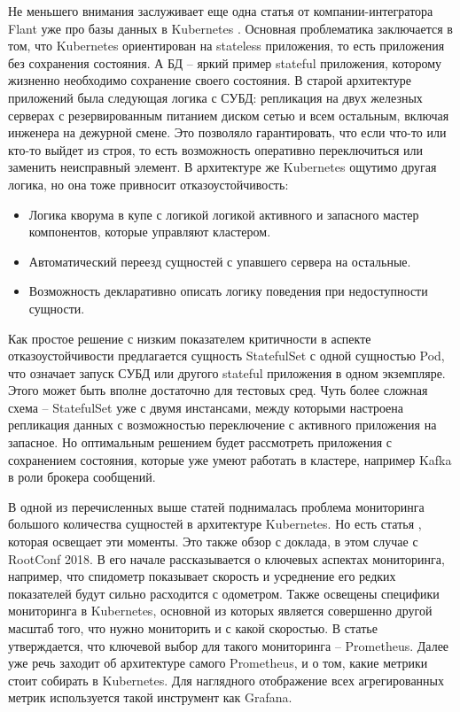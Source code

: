 Не меньшего внимания заслуживает еще одна статья от компании-интегратора Flant уже про базы данных в Kubernetes \cite{habr:flant:db-and-k8s}. Основная проблематика заключается в том, что Kubernetes ориентирован на stateless приложения, то есть приложения без сохранения состояния. А БД
-- яркий пример stateful приложения,
которому жизненно необходимо сохранение своего состояния. В старой архитектуре приложений была следующая логика с СУБД: репликация на двух железных серверах с резервированным питанием диском сетью и всем остальным, включая инженера на дежурной смене. Это позволяло гарантировать, что если что-то или кто-то выйдет из строя, то есть возможность оперативно переключиться или заменить неисправный элемент. В архитектуре же Kubernetes ощутимо другая логика, но она тоже привносит отказоустойчивость:
\begin{itemize}
    \item Логика кворума в купе с логикой логикой активного и запасного мастер компонентов, которые управляют кластером.
    \item Автоматический переезд сущностей с упавшего сервера на остальные.
    \item Возможность декларативно описать логику поведения при недоступности сущности.
\end{itemize}

Как простое решение с низким показателем критичности в аспекте отказоустойчивости предлагается сущность StatefulSet с одной сущностью Pod, что означает запуск СУБД
или другого stateful приложения в одном экземпляре. Этого может быть вполне достаточно для тестовых сред. Чуть более сложная схема -- StatefulSet уже с двумя инстансами, между которыми настроена репликация данных с возможностью переключение с активного приложения на запасное. Но оптимальным решением будет рассмотреть приложения с сохранением состояния, которые уже умеют работать в кластере, например Kafka
в роли брокера сообщений.

В одной из перечисленных выше статей поднималась проблема мониторинга большого количества сущностей в архитектуре Kubernetes. Но есть статья \cite{habr:flant:k8s-mon}, которая освещает эти моменты. Это также обзор с доклада, в этом случае с RootConf 2018. В его начале рассказывается о ключевых аспектах мониторинга, например, что спидометр показывает скорость и усреднение его редких показателей будут сильно расходится с одометром. Также освещены специфики мониторинга в Kubernetes, основной из которых является совершенно другой масштаб того, что нужно мониторить и с какой скоростью. В статье утверждается, что ключевой выбор для такого мониторинга -- Prometheus. Далее уже речь заходит об архитектуре самого Prometheus, и о том, какие метрики стоит собирать в Kubernetes. Для наглядного отображение всех агрегированных метрик используется такой инструмент как Grafana.

